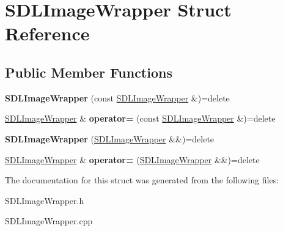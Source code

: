 \hypertarget{struct_s_d_l_image_wrapper}{}\section{S\+D\+L\+Image\+Wrapper Struct Reference}
\label{struct_s_d_l_image_wrapper}
\subsection*{Public Member Functions}
\begin{DoxyCompactItemize}
\item 
\mbox{\label{struct_s_d_l_image_wrapper_a30f57253b56c4bbff0eb54462ad70157}} 
{\bfseries S\+D\+L\+Image\+Wrapper} (const \mbox{\hyperlink{struct_s_d_l_image_wrapper}{S\+D\+L\+Image\+Wrapper}} \&)=delete
\item 
\mbox{\label{struct_s_d_l_image_wrapper_a5e9805b928c4c6a4e28eb8ff91d2e897}} 
\mbox{\hyperlink{struct_s_d_l_image_wrapper}{S\+D\+L\+Image\+Wrapper}} \& {\bfseries operator=} (const \mbox{\hyperlink{struct_s_d_l_image_wrapper}{S\+D\+L\+Image\+Wrapper}} \&)=delete
\item 
\mbox{\label{struct_s_d_l_image_wrapper_acce0d521929991179814f7111815eef5}} 
{\bfseries S\+D\+L\+Image\+Wrapper} (\mbox{\hyperlink{struct_s_d_l_image_wrapper}{S\+D\+L\+Image\+Wrapper}} \&\&)=delete
\item 
\mbox{\label{struct_s_d_l_image_wrapper_ae6330fc82f2851a17c02651a376b4b4f}} 
\mbox{\hyperlink{struct_s_d_l_image_wrapper}{S\+D\+L\+Image\+Wrapper}} \& {\bfseries operator=} (\mbox{\hyperlink{struct_s_d_l_image_wrapper}{S\+D\+L\+Image\+Wrapper}} \&\&)=delete
\end{DoxyCompactItemize}


The documentation for this struct was generated from the following files\+:\begin{DoxyCompactItemize}
\item 
S\+D\+L\+Image\+Wrapper.\+h\item 
S\+D\+L\+Image\+Wrapper.\+cpp\end{DoxyCompactItemize}

